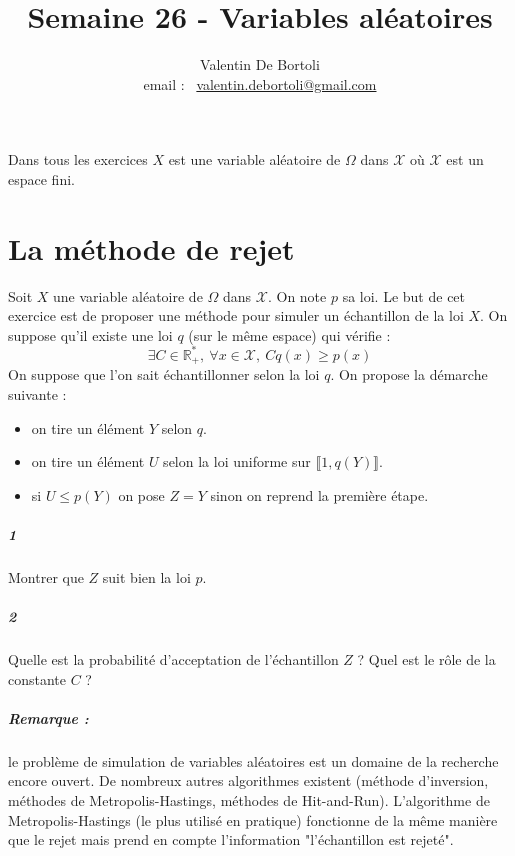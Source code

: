 \documentclass[10pt,a4paper]{article}
\title{Semaine 26 - Variables aléatoires}
\author{Valentin De Bortoli \\ email : \ \href{mailto:valentin.debortoli@gmail.com}{valentin.debortoli@gmail.com}}
\date{}
\begin{document}
\maketitle
Dans tous les exercices $X$ est une variable aléatoire de $\Omega$ dans $\mathcal{X}$ où $\mathcal{X}$ est un espace fini.
\section{La méthode de rejet}
Soit $X$ une variable aléatoire de $\Omega$ dans $\mathcal{X}$. On note $p$ sa loi.
Le but de cet exercice est de proposer une méthode pour simuler un échantillon de la loi $X$. On suppose qu'il existe une loi $q$ (sur le même espace) qui vérifie :
\begin{equation*}
\exists C \in \mathbb{R}_+^*, \ \forall x \in \mathcal{X}, \ Cq(x) \ge p(x)
\end{equation*}
On suppose que l'on sait échantillonner selon la loi $q$.
On propose la démarche suivante :
\begin{itemize}
\item on tire un élément $Y$ selon $q$.
\item on tire un élément $U$ selon la loi uniforme sur $\llbracket 1, q(Y) \rrbracket$.
\item si $U \le p(Y)$ on pose $Z=Y$ sinon on reprend la première étape.
\end{itemize}
\subparagraph{1}Montrer que $Z$ suit bien la loi $p$.
\subparagraph{2}Quelle est la probabilité d'acceptation de l'échantillon $Z$ ? Quel est le rôle de la constante $C$ ?
\subparagraph{Remarque :} le problème de simulation de variables aléatoires est un domaine de la recherche encore ouvert. De nombreux autres algorithmes existent (méthode d'inversion, méthodes de Metropolis-Hastings, méthodes de Hit-and-Run). L'algorithme de Metropolis-Hastings (le plus utilisé en pratique) fonctionne de la même manière que le rejet mais prend en compte l'information "l'échantillon est rejeté".
\end{document}
